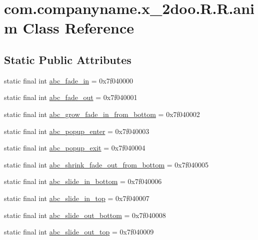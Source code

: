 \hypertarget{classcom_1_1companyname_1_1x__2doo_1_1_r_1_1anim}{
\section{com.companyname.x\_\-2doo.R.R.anim Class Reference}
\label{classcom_1_1companyname_1_1x__2doo_1_1_r_1_1anim}
}
\subsection*{Static Public Attributes}
\begin{CompactItemize}
\item 
static final int \hyperlink{classcom_1_1companyname_1_1x__2doo_1_1_r_1_1anim_7f1f86d386f7b6f39f806538e538be10}{abc\_\-fade\_\-in} = 0x7f040000
\item 
static final int \hyperlink{classcom_1_1companyname_1_1x__2doo_1_1_r_1_1anim_b918f3f15e0a2e507c19b64c30100028}{abc\_\-fade\_\-out} = 0x7f040001
\item 
static final int \hyperlink{classcom_1_1companyname_1_1x__2doo_1_1_r_1_1anim_0bf36ceed286837c1553ef7db300be6d}{abc\_\-grow\_\-fade\_\-in\_\-from\_\-bottom} = 0x7f040002
\item 
static final int \hyperlink{classcom_1_1companyname_1_1x__2doo_1_1_r_1_1anim_7d9badb65e726ccb2cc9645947f8ae4d}{abc\_\-popup\_\-enter} = 0x7f040003
\item 
static final int \hyperlink{classcom_1_1companyname_1_1x__2doo_1_1_r_1_1anim_442377f905448c504dd208868c13cc0c}{abc\_\-popup\_\-exit} = 0x7f040004
\item 
static final int \hyperlink{classcom_1_1companyname_1_1x__2doo_1_1_r_1_1anim_e7274e5978658dca14d81c9f214a0833}{abc\_\-shrink\_\-fade\_\-out\_\-from\_\-bottom} = 0x7f040005
\item 
static final int \hyperlink{classcom_1_1companyname_1_1x__2doo_1_1_r_1_1anim_98cc572c731893f1f4523e170b09af10}{abc\_\-slide\_\-in\_\-bottom} = 0x7f040006
\item 
static final int \hyperlink{classcom_1_1companyname_1_1x__2doo_1_1_r_1_1anim_eb912f6fc607894a3fd5324c684c5d79}{abc\_\-slide\_\-in\_\-top} = 0x7f040007
\item 
static final int \hyperlink{classcom_1_1companyname_1_1x__2doo_1_1_r_1_1anim_fd58319912c8f211d1fbe45ab66b8974}{abc\_\-slide\_\-out\_\-bottom} = 0x7f040008
\item 
static final int \hyperlink{classcom_1_1companyname_1_1x__2doo_1_1_r_1_1anim_bc9cba4c92643c70a8e8252ddb75bfa1}{abc\_\-slide\_\-out\_\-top} = 0x7f040009

\end{CompactItemize}
